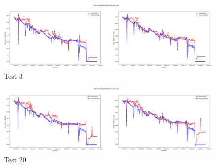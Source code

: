 \begin{figure}[h!]
    \centering
    \includegraphics[width=1.0\textwidth]{images/Teste_lag_3.png}
    \caption{Test 3}
    \label{fig:Test_3}
\end{figure}

\begin{figure}[h!]
    \centering
    \includegraphics[width=1.0\textwidth]{images/Teste_lag_20.png}
    \caption{Test 20}
    \label{fig:Test_20}
\end{figure}